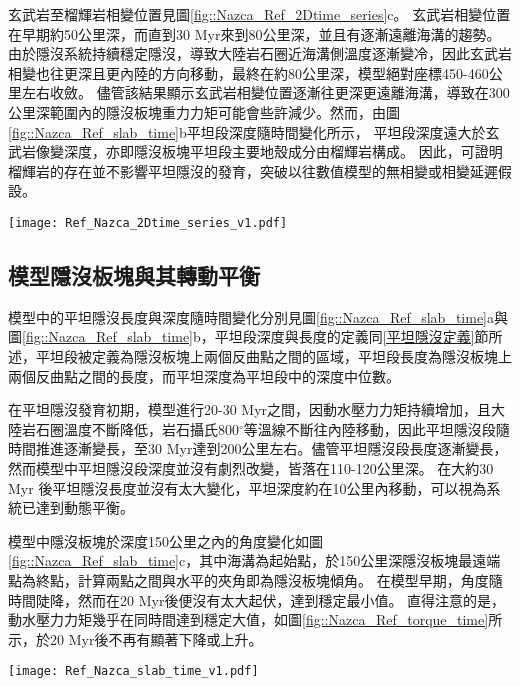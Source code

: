 玄武岩至榴輝岩相變位置見圖\ref{fig::Nazca_Ref_2Dtime_series}c。
玄武岩相變位置在早期約50公里深，而直到30 Myr來到80公里深，並且有逐漸遠離海溝的趨勢。
由於隱沒系統持續穩定隱沒，導致大陸岩石圈近海溝側溫度逐漸變冷，因此玄武岩相變也往更深且更內陸的方向移動，最終在約80公里深，模型絕對座標450-460公里左右收斂。
儘管該結果顯示玄武岩相變位置逐漸往更深更遠離海溝，導致在300公里深範圍內的隱沒板塊重力力矩可能會些許減少。然而，由圖\ref{fig::Nazca_Ref_slab_time}b平坦段深度隨時間變化所示，
平坦段深度遠大於玄武岩像變深度，亦即隱沒板塊平坦段主要地殼成分由榴輝岩構成。
因此，可證明榴輝岩的存在並不影響平坦隱沒的發育，突破以往數值模型的無相變或相變延遲假設。
\begin{figure*}[h]
    \centering
    \texttt{[image: Ref\_Nazca\_2Dtime\_series\_v1.pdf]}
    \caption[納茲卡參考模型部分熔融、岩漿庫與玄武岩相變時空關係圖]{納茲卡參考模型部分熔融、岩漿庫與玄武岩相變時空關係圖。}
    \label{fig::Nazca_Ref_2Dtime_series}
\end{figure*}

\newpage
\subsection{模型隱沒板塊與其轉動平衡}
模型中的平坦隱沒長度與深度隨時間變化分別見圖\ref{fig::Nazca_Ref_slab_time}a與圖\ref{fig::Nazca_Ref_slab_time}b，平坦段深度與長度的定義同\ref{平坦隱沒定義}節所述，平坦段被定義為隱沒板塊上兩個反曲點之間的區域，平坦段長度為隱沒板塊上兩個反曲點之間的長度，而平坦深度為平坦段中的深度中位數。

在平坦隱沒發育初期，模型進行20-30 Myr之間，因動水壓力力矩持續增加，且大陸岩石圈溫度不斷降低，岩石攝氏800$^{\circ}$等溫線不斷往內陸移動，因此平坦隱沒段隨時間推進逐漸變長，至30 Myr達到200公里左右。儘管平坦隱沒段長度逐漸變長，然而模型中平坦隱沒段深度並沒有劇烈改變，皆落在110-120公里深。
在大約30 Myr 後平坦隱沒長度並沒有太大變化，平坦深度約在10公里內移動，可以視為系統已達到動態平衡。

模型中隱沒板塊於深度150公里之內的角度變化如圖\ref{fig::Nazca_Ref_slab_time}c，其中海溝為起始點，於150公里深隱沒板塊最遠端點為終點，計算兩點之間與水平的夾角即為隱沒板塊傾角。
在模型早期，角度隨時間陡降，然而在20 Myr後便沒有太大起伏，達到穩定最小值。
直得注意的是，動水壓力力矩幾乎在同時間達到穩定大值，如圖\ref{fig::Nazca_Ref_torque_time}所示，於20 Myr後不再有顯著下降或上升。

\begin{figure*}[h]
    \centering
    \texttt{[image: Ref\_Nazca\_slab\_time\_v1.pdf]}
    \caption[納茲卡參考模型隱沒板塊狀態隨時間變化]{納茲卡參考模型隱沒板塊狀態隨時間變化。}
    \label{fig::Nazca_Ref_slab_time}
\end{figure*}

